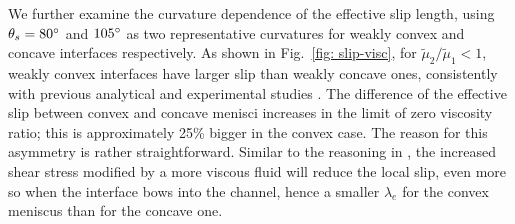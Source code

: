 We further examine the curvature dependence of the effective slip length, using $\theta_s = 80\degree$ and $105\degree$ as two representative curvatures for weakly convex and concave interfaces respectively.
As shown in Fig.\ \ref{fig: slip-visc},
for $\tilde{\mu}_2/\tilde{\mu}_1 < 1$, weakly convex interfaces have larger slip than weakly concave ones, consistently with previous analytical and experimental studies \citep{Davis_Lauga, Karatay}. 
The difference of the effective slip between convex and concave menisci increases in the limit of zero viscosity ratio; this is 
approximately 25\% bigger in the convex  case.
The reason for this asymmetry is rather straightforward. 
Similar to the reasoning in \cite{Sbragalia_Prosperetti}, the increased shear stress modified by a more viscous fluid will reduce the local slip, even more so when the interface bows into the channel, hence a smaller $\lambda_e$ for the convex meniscus than for the concave one.



